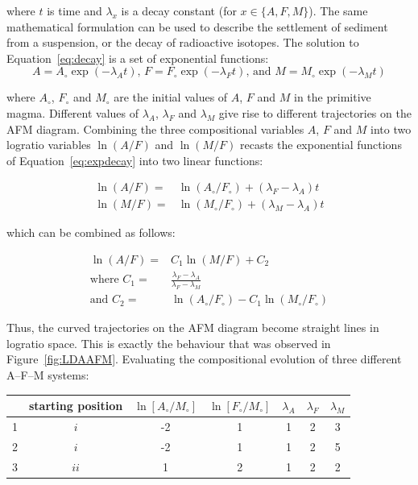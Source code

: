 \noindent where $t$ is time and $\lambda_x$ is a decay constant (for
$x \in \{A, F, M\}$). The same mathematical formulation can be used to
describe the settlement of sediment from a suspension, or the decay of
radioactive isotopes.  The solution to Equation~\ref{eq:decay} is a
set of exponential functions:
\begin{equation}
  A = A_\circ \exp(-\lambda_A t) \mbox{,~}
  F = F_\circ \exp(-\lambda_F t) \mbox{,~and~}
  M = M_\circ \exp(-\lambda_M t)
  \label{eq:expdecay}
\end{equation}

\noindent where $A_\circ$, $F_\circ$ and $M_\circ$ are the initial
values of $A$, $F$ and $M$ in the primitive magma. Different values of
$\lambda_A$, $\lambda_F$ and $\lambda_M$ give rise to different
trajectories on the AFM diagram. Combining the three compositional
variables $A$, $F$ and $M$ into two logratio variables $\ln(A/F)$ and
$\ln(M/F)$ recasts the exponential functions of
Equation~\ref{eq:expdecay} into two linear functions:

\begin{align}
  \ln(A/F) = & \ln(A_\circ/F_\circ) + (\lambda_F-\lambda_A)t\\
  \ln(M/F) = & \ln(M_\circ/F_\circ) + (\lambda_M-\lambda_A)t
\end{align}

\noindent which can be combined as follows:

\begin{equation}
  \begin{split}
    \ln(A/F) = & C_1 \ln(M/F) + C_2 \\
    \mbox{where~} C_1 = & \frac{\lambda_F-\lambda_A}{\lambda_F-\lambda_M} \\
    \mbox{and~} C_2 = & \ln(A_\circ/F_\circ) - C_1 \ln(M_\circ/F_\circ) 
  \end{split}
\end{equation}

Thus, the curved trajectories on the AFM diagram become straight lines
in logratio space. This is exactly the behaviour that was observed in
Figure~\ref{fig:LDAAFM}. Evaluating the compositional evolution of
three different A--F--M systems:

\begin{center}
\begin{tabular}{c|cccccc}
  & starting position & $\ln[A_\circ/M_\circ]$ & $\ln[F_\circ/M_\circ]$ &
  $\lambda_A$ & $\lambda_F$ & $\lambda_M$ \\ \hline
  1 & $i$ & -2 & 1 & 1 & 2 & 3 \\
  2 & $i$ & -2 & 1 & 1 & 2 & 5 \\
  3 & $ii$ & 1 & 2 & 1 & 2 & 2 \\
\end{tabular}
\end{center}
  

